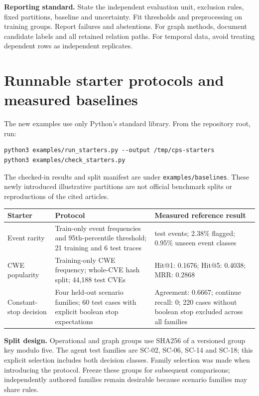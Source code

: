 \textbf{Reporting standard.} State the independent evaluation unit, exclusion rules, fixed partitions, baseline and uncertainty. Fit thresholds and preprocessing on training groups. Report failures and abstentions. For graph methods, document candidate labels and all retained relation paths. For temporal data, avoid treating dependent rows as independent replicates.

\clearpage\section{Runnable starter protocols and measured baselines}
The new examples use only Python's standard library. From the repository root, run:
\begin{Verbatim}[fontsize=\small,breaklines=true]
python3 examples/run_starters.py --output /tmp/cps-starters
python3 examples/check_starters.py
\end{Verbatim}
The checked-in results and split manifest are under \texttt{examples/baselines}. These newly introduced illustrative partitions are not official benchmark splits or reproductions of the cited articles.

\begingroup\small\renewcommand{\arraystretch}{1.3}
\begin{tabularx}{\linewidth}{>{\raggedright\arraybackslash}p{29mm}>{\raggedright\arraybackslash}X>{\raggedright\arraybackslash}X}
\toprule\textbf{Starter} & \textbf{Protocol} & \textbf{Measured reference result}\\\midrule
Event rarity & Train-only event frequencies and 95th-percentile threshold; 21 training and 6 test traces & 420 test events; 2.38\% flagged; 0.95\% unseen event classes\\
CWE popularity & Training-only CWE frequency; whole-CVE hash split; 44,188 test CVEs & Hit@1: 0.1676; Hit@5: 0.4038; MRR: 0.2868\\
Constant-stop decision & Four held-out scenario families; 60 test cases with explicit boolean stop expectations & Agreement: 0.6667; continue recall: 0; 220 cases without boolean stop excluded across all families\\
\bottomrule\end{tabularx}\endgroup

\textbf{Split design.} Operational and graph groups use SHA256 of a versioned group key modulo five. The agent test families are SC-02, SC-06, SC-14 and SC-18; this explicit selection includes both decision classes. Family selection was made when introducing the protocol. Freeze these groups for subsequent comparisons; independently authored families remain desirable because scenario families may share rules.

